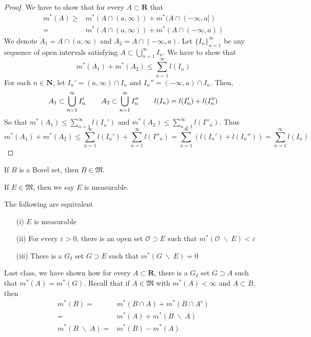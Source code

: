 \vspace{2ex}
\begin{proof}
We have to show that for every $A\subset {\bm R}$ that 
\begin{align*}
	m^{*}(A)\geq& m^{*}(A\cap (a,\infty ))+m^{*}(A\cap (-\infty ,a])\\
	=&m^{*}(A\cap (a,\infty ))+m^{*}(A\cap (-\infty ,a)) 
\end{align*}
We denote $A_1=A\cap (a,\infty )$ and $A_2=A\cap (-\infty ,a)$. Let $\{I_{n}\}^{\infty }_{n=1}$ be any sequence of open intervals satisfying $A\subset \bigcup ^{\infty }_{n=1}I_{n}$. We have to show that 
\[m^{*}(A_1)+m^{*}(A_2)\leq \sum ^{\infty }_{n=1}l(I_{n})\]
For each $n\in {\bm N}$, let $I_{n}'=(a,\infty )\cap I_{n}$ and $I_{n}''=(-\infty ,a)\cap I_{n}$. Then,
\[A_1\subset \bigcup ^{\infty }_{n=1}I'_{n}\hspace{5ex}A_{2}\subset \bigcup ^{\infty }_{n=1}I_{n}''\hspace{5ex}l(I_{n})=l(I'_{n})+l(I_{n}'')\]
So that  $m^{*}(A_1)\leq \sum ^{\infty }_{n=1}l(I_{n}')$ and $m^{*}(A_2)\leq \sum ^{\infty }_{n=1}l(I''_{n})$. Thus
\[m^{*}(A_1)+m^{*}(A_2)\leq \sum ^{\infty }_{n=1}l(I_{n}')+\sum ^{\infty }_{n=1}l(I''_{n})=\sum ^{\infty }_{n=1}(l(I_{n}')+l(I_{n}''))=\sum _{n=1}^{\infty }l(I_{n})\]
\end{proof}
\vspace{2ex}
\begin{thm}
If $B$ is a Borel set, then $B\in \mathfrak{M}$. 
\end{thm}
\vspace{2ex}
\begin{rmk}
If $E\in \mathfrak{M}$, then we say $E$ is measurable. 
\end{rmk}
\vspace{2ex}
\begin{thm}
The following are equivalent
\begin{itemize}
	\item[(i)] $E$ is measurable
	\item[(ii)] For every $\varepsilon >0$, there is an open set $\mathcal{O}\supset E$ such that $m^{*}(\mathcal{O}\;\backslash\;E)<\varepsilon $
	\item[(iii)] There is a $G_{\delta }$ set $G\supset E$ such that $m^{*}(G\;\backslash\; E)=0$
\end{itemize}
\end{thm}
\vspace{2ex}
\begin{rmk}
Last class, we have shown how for every $A\subset {\bm R}$, there is a $G_{\delta }$ set $G\supset A$ such that $m^{*}(A)=m^{*}(G)$. Recall that if $A\in \mathfrak{M}$ with $m^{*}(A)<\infty $ and $A\subset B$, then 
\begin{align*}
	m^{*}(B)=&m^{*}(B\cap A)+m^{*}(B\cap A^{c})\\
	=&m^{*}(A)+m^{*}(B\;\backslash\; A)\\
 m^{*}(B\;\backslash\; A)=&m^{*}(B)-m^{*}(A)
\end{align*}
\end{rmk}
